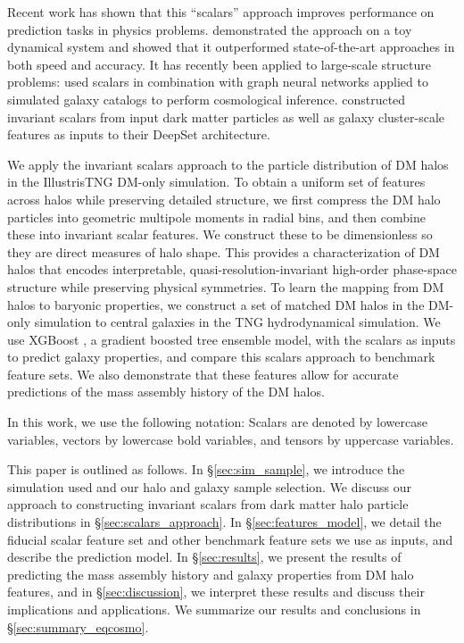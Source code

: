 Recent work has shown that this ``scalars'' approach improves performance on prediction tasks in physics problems.
\cite{yao_simple_2021} demonstrated the approach on a toy dynamical system and showed that it outperformed state-of-the-art approaches in both speed and accuracy.
It has recently been applied to large-scale structure problems: \cite{villanueva-domingo_learning_2022} used scalars in combination with graph neural networks applied to simulated galaxy catalogs to perform cosmological inference.
\cite{thiele_predicting_2022} constructed invariant scalars from input dark matter particles as well as galaxy cluster-scale features as inputs to their DeepSet architecture.

We apply the invariant scalars approach to the particle distribution of DM halos in the IllustrisTNG DM-only simulation.
To obtain a uniform set of features across halos while preserving detailed structure, we first compress the DM halo particles into geometric multipole moments in radial bins, and then combine these into invariant scalar features.
We construct these to be dimensionless so they are direct measures of halo shape.
This provides a characterization of DM halos that encodes interpretable, quasi-resolution-invariant high-order phase-space structure while preserving physical symmetries.
To learn the mapping from DM halos to baryonic properties, we construct a set of matched DM halos in the DM-only simulation to central galaxies in the TNG hydrodynamical simulation.
We use XGBoost \citep{chen_xgboost_2016}, a gradient boosted tree ensemble model, with the scalars as inputs to predict galaxy properties, and compare this scalars approach to benchmark feature sets. 
We also demonstrate that these features allow for accurate predictions of the mass assembly history of the DM halos.

In this work, we use the following notation: 
Scalars are denoted by lowercase variables, vectors by lowercase bold variables, and tensors by uppercase variables.

This paper is outlined as follows.
In \S\ref{sec:sim_sample}, we introduce the simulation used and our halo and galaxy sample selection. 
We discuss our approach to constructing invariant scalars from dark matter halo particle distributions in \S\ref{sec:scalars_approach}.
In \S\ref{sec:features_model}, we detail the fiducial scalar feature set and other benchmark feature sets we use as inputs, and describe the prediction model.
In \S\ref{sec:results}, we present the results of predicting the mass assembly history and galaxy properties from DM halo features, and in \S\ref{sec:discussion}, we interpret these results and discuss their implications and applications.
We summarize our results and conclusions in \S\ref{sec:summary_eqcosmo}.


